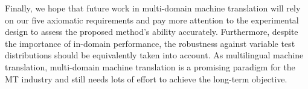 Finally, we hope that future work in multi-domain machine translation will rely on our five axiomatic requirements and pay more attention to the experimental design to assess the proposed method's ability accurately. Furthermore, despite the importance of in-domain performance, the robustness against variable test distributions should be equivalently taken into account. As multilingual machine translation, multi-domain machine translation is a promising paradigm for the MT industry and still needs lots of effort to achieve the long-term objective.




























































































